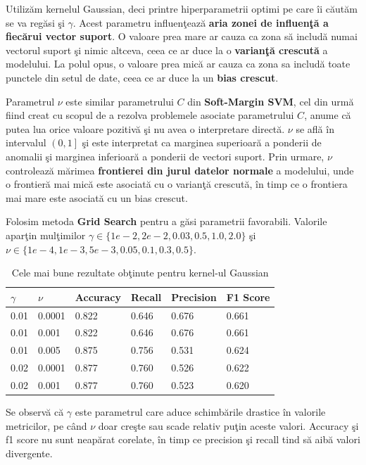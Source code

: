 Utilizăm kernelul Gaussian, deci printre hiperparametrii optimi pe care îi căutăm 
se va regăsi şi $\gamma$. Acest parametru influenţează 
\textbf{aria zonei de influenţă a 
fiecărui vector suport}. O valoare prea mare ar cauza ca zona să includă numai 
vectorul suport şi nimic altceva, ceea ce ar duce la o \textbf{varianţă crescută} 
a modelului. La polul opus, o valoare prea mică ar cauza ca zona sa includă 
toate punctele din setul de date, ceea ce ar duce la un \textbf{bias crescut}.

Parametrul $\nu$ este similar parametrului $C$ din \textbf{Soft-Margin SVM}, 
cel din urmă
fiind creat cu scopul de a rezolva problemele asociate parametrului $C$, anume că 
putea lua orice valoare pozitivă şi nu avea o interpretare directă. $\nu$ se află 
în intervalul $\left(0, 1\right]$ şi este interpretat ca marginea superioară a ponderii de anomalii 
şi marginea inferioară a ponderii de vectori suport. Prin urmare, $\nu$ controlează
mărimea \textbf{frontierei din jurul datelor normale} a modelului, 
unde o frontieră mai mică este asociată
cu o varianţă crescută, în timp ce o frontiera mai mare este asociată cu un bias 
crescut.

Folosim metoda \textbf{Grid Search} pentru a găsi parametrii favorabili. Valorile aparţin 
mulţimilor $\gamma \in \{1e-2, 2e-2, 0.03, 0.5, 1.0, 2.0\}$ şi 
$\nu \in \{1e-4, 1e-3, 5e-3, 0.05, 0.1, 0.3, 0.5\}$.

\begin{table}[H]
  \centering
  \begin{tabularx}{\textwidth}{
      |X
      |X
      |X
      |X
      |X
      |X|
  }
  \hline
  $\gamma$ & $\nu$ & {Accuracy} & {Recall} & {Precision} & {F1 Score} \\
  \hline
  \rowcolor{gray!20} 0.01 &  0.0001	&  0.822 &  0.646	&  0.676	&  0.661  \\
  0.01	&  0.001 &  0.822	&  0.646	&  0.676	&  0.661 \\
  \rowcolor{gray!20} 0.01 & 0.005 &  0.875 &  0.756	&  0.531	&  0.624  \\
  0.02 & 0.0001	& 0.877 &  0.760 &  0.526	&  0.622 \\
  \rowcolor{gray!20} 0.02 &  0.001	&  0.877 & 0.760 &  0.523	&  0.620 \\
  \hline
  \end{tabularx}
  \caption{Cele mai bune rezultate obţinute pentru kernel-ul Gaussian}
\end{table}

Se observă că $\gamma$ este parametrul care aduce schimbările drastice în valorile 
metricilor, pe când $\nu$ doar creşte sau scade relativ puţin aceste valori. Accuracy şi f1 score 
nu sunt neapărat corelate, în timp ce precision şi recall tind să aibă valori 
divergente.

